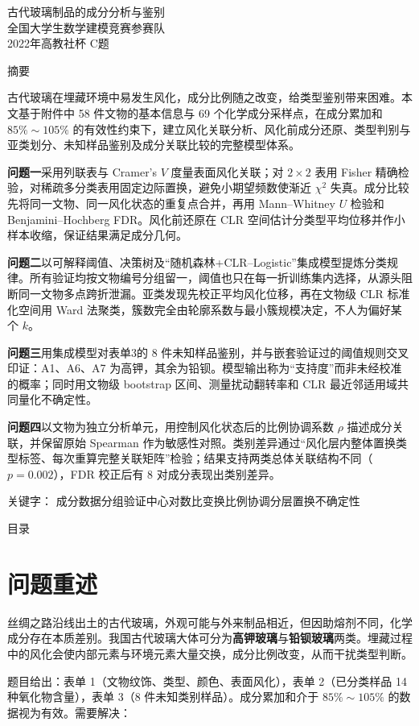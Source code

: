 \documentclass[fontset=windows, UTF8, 12pt, a4paper]{ctexart}
\makeatletter
\newcommand{\papertitle}[1]{%
  \thispagestyle{empty}%
  \begin{center}
    {\fontsize{16pt}{22pt}\heiti #1}\\[0.8em]
    {\large 全国大学生数学建模竞赛参赛队}\\[0.35em]
    {\normalsize 2022年高教社杯 C题}
  \end{center}
  \vspace{0.8em}
}
\newcommand{\abstractcn}[2]{%
  \thispagestyle{empty}%
  \begin{center}{\fontsize{14pt}{17pt}\heiti 摘\quad 要}\end{center}
  \vspace{0.4em}
  #1\par
  \vspace{1em}
  {\heiti 关键字：}#2\par
  \newpage
}
\newcommand{\tocpage}{%
  \setcounter{page}{1}%
  \begin{center}
    {\fontsize{15pt}{20pt}\heiti 目\quad 录}
  \end{center}
  \vspace{0.4em}
  \@starttoc{toc}%
  \newpage
}
\makeatother
\begin{document}
\papertitle{古代玻璃制品的成分分析与鉴别}

\abstractcn{%
古代玻璃在埋藏环境中易发生风化，成分比例随之改变，给类型鉴别带来困难。本文基于附件中 58 件文物的基本信息与 69 个化学成分采样点，在成分累加和 $85\%\sim105\%$ 的有效性约束下，建立风化关联分析、风化前成分还原、类型判别与亚类划分、未知样品鉴别及成分关联比较的完整模型体系。

\textbf{问题一}采用列联表与 Cramer's $V$ 度量表面风化关联；对 $2\times2$ 表用 Fisher 精确检验，对稀疏多分类表用固定边际置换，避免小期望频数使渐近 $\chi^2$ 失真。成分比较先将同一文物、同一风化状态的重复点合并，再用 Mann--Whitney $U$ 检验和 Benjamini--Hochberg FDR。风化前还原在 CLR 空间估计分类型平均位移并作小样本收缩，保证结果满足成分几何。

\textbf{问题二}以可解释阈值、决策树及“随机森林+CLR--Logistic”集成模型提炼分类规律。所有验证均按文物编号分组留一，阈值也只在每一折训练集内选择，从源头阻断同一文物多点跨折泄漏。亚类发现先校正平均风化位移，再在文物级 CLR 标准化空间用 Ward 法聚类，簇数完全由轮廓系数与最小簇规模决定，不人为偏好某个 $k$。

\textbf{问题三}用集成模型对表单3的 8 件未知样品鉴别，并与嵌套验证过的阈值规则交叉印证：A1、A6、A7 为高钾，其余为铅钡。模型输出称为“支持度”而非未经校准的概率；同时用文物级 bootstrap 区间、测量扰动翻转率和 CLR 最近邻适用域共同量化不确定性。

\textbf{问题四}以文物为独立分析单元，用控制风化状态后的比例协调系数 $\rho$ 描述成分关联，并保留原始 Spearman 作为敏感性对照。类别差异通过“风化层内整体置换类型标签、每次重算完整关联矩阵”检验；结果支持两类总体关联结构不同（$p=0.002$），FDR 校正后有 8 对成分表现出类别差异。
}{%
成分数据\quad 分组验证\quad 中心对数比变换\quad 比例协调\quad 分层置换\quad 不确定性
}

\tocpage

\section{问题重述}

丝绸之路沿线出土的古代玻璃，外观可能与外来制品相近，但因助熔剂不同，化学成分存在本质差别。我国古代玻璃大体可分为\textbf{高钾玻璃}与\textbf{铅钡玻璃}两类。埋藏过程中的风化会使内部元素与环境元素大量交换，成分比例改变，从而干扰类型判断。

题目给出：表单 1（文物纹饰、类型、颜色、表面风化），表单 2（已分类样品 14 种氧化物含量），表单 3（8 件未知类别样品）。成分累加和介于 $85\%\sim105\%$ 的数据视为有效。需要解决：
\end{document}
